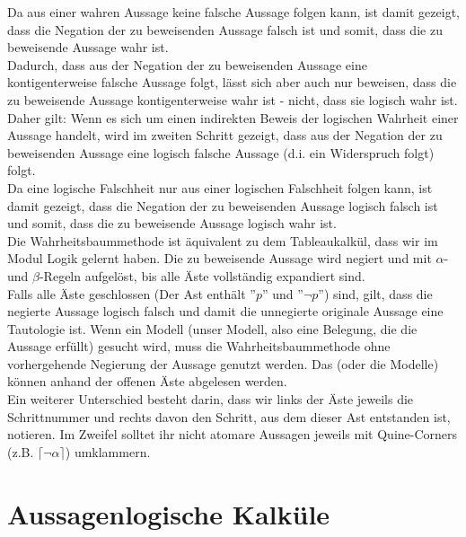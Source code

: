 \documentclass{scrartcl}
\begin{document}
Da aus einer wahren Aussage keine falsche Aussage folgen kann, ist damit gezeigt, dass die Negation der zu beweisenden Aussage falsch ist und somit, dass die zu beweisende Aussage wahr ist. \\

Dadurch, dass aus der Negation der zu beweisenden Aussage eine kontigenterweise falsche Aussage folgt, lässt sich aber auch nur beweisen, dass die zu beweisende Aussage kontigenterweise wahr ist - nicht, dass sie logisch wahr ist. \\

Daher gilt: Wenn es sich um einen indirekten Beweis der logischen Wahrheit einer Aussage handelt, wird im zweiten Schritt gezeigt, dass aus der Negation der zu beweisenden Aussage eine logisch falsche Aussage (d.i. ein Widerspruch folgt) folgt. \\

Da eine logische Falschheit nur aus einer logischen Falschheit folgen kann, ist damit gezeigt, dass die Negation der zu beweisenden Aussage logisch falsch ist und somit, dass die zu beweisende Aussage logisch wahr ist. \\

Die Wahrheitsbaummethode ist äquivalent zu dem Tableaukalkül, dass wir im Modul Logik gelernt haben. Die zu beweisende Aussage wird negiert und mit $ \alpha $- und $ \beta $-Regeln aufgelöst, bis alle Äste vollständig expandiert sind. \\

Falls alle Äste geschlossen (Der Ast enthält ''$ p $'' und ''$ \neg p $'') sind, gilt, dass die negierte Aussage logisch falsch und damit die unnegierte originale Aussage eine Tautologie ist. Wenn ein Modell (unser Modell, also eine Belegung, die die Aussage erfüllt) gesucht wird, muss die Wahrheitsbaummethode ohne vorhergehende Negierung der Aussage genutzt werden. Das (oder die Modelle) können anhand der offenen Äste abgelesen werden. \\

Ein weiterer Unterschied besteht darin, dass wir links der Äste jeweils die Schrittnummer und rechts davon den Schritt, aus dem dieser Ast entstanden ist, notieren. Im Zweifel solltet ihr nicht atomare Aussagen jeweils mit Quine-Corners (z.B. $ \lceil \neg \alpha \rceil $) umklammern.

\section{Aussagenlogische Kalküle}
\end{document}
